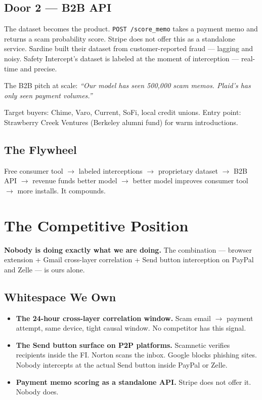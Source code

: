 \documentclass[12pt, letterpaper]{article}
\begin{document}
\subsection{Door 2 --- B2B API}

The dataset becomes the product. \texttt{POST /score\_memo} takes a payment memo and returns a scam probability score. Stripe does not offer this as a standalone service. Sardine built their dataset from customer-reported fraud --- lagging and noisy. Safety Intercept's dataset is labeled at the moment of interception --- real-time and precise.

The B2B pitch at scale: \textit{``Our model has seen 500,000 scam memos. Plaid's has only seen payment volumes.''}

Target buyers: Chime, Varo, Current, SoFi, local credit unions. Entry point: Strawberry Creek Ventures (Berkeley alumni fund) for warm introductions.

\subsection{The Flywheel}

Free consumer tool $\rightarrow$ labeled interceptions $\rightarrow$ proprietary dataset $\rightarrow$ B2B API $\rightarrow$ revenue funds better model $\rightarrow$ better model improves consumer tool $\rightarrow$ more installs. It compounds.

\section{The Competitive Position}

\textbf{Nobody is doing exactly what we are doing.} The combination --- browser extension + Gmail cross-layer correlation + Send button interception on PayPal and Zelle --- is ours alone.

\subsection{Whitespace We Own}

\begin{itemize}
  \item \textbf{The 24-hour cross-layer correlation window.} Scam email $\rightarrow$ payment attempt, same device, tight causal window. No competitor has this signal.
  \item \textbf{The Send button surface on P2P platforms.} Scamnetic verifies recipients inside the FI. Norton scans the inbox. Google blocks phishing sites. Nobody intercepts at the actual Send button inside PayPal or Zelle.
  \item \textbf{Payment memo scoring as a standalone API.} Stripe does not offer it. Nobody does.
\end{itemize}
\end{document}

